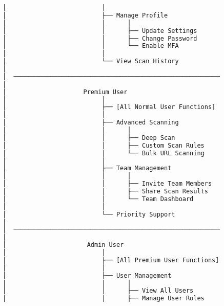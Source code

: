 \documentclass[main.tex]{subfiles}
\begin{document}
\begin{figure}[h]
\begin{lstlisting}[language=bash, caption=WebSecPen системийн Use Case диаграм]
│                          │                                      │
│                          ├── Manage Profile                    │
│                          │      │                              │
│                          │      ├── Update Settings            │
│                          │      ├── Change Password            │
│                          │      └── Enable MFA                 │
│                          │                                      │
│                          └── View Scan History                 │
│                                                                 │
│  ─────────────────────────────────────────────────────────────  │
│                                                                 │
│                     Premium User                                │
│                          │                                      │
│                          ├── [All Normal User Functions]       │
│                          │                                      │
│                          ├── Advanced Scanning                 │
│                          │      │                              │
│                          │      ├── Deep Scan                  │
│                          │      ├── Custom Scan Rules          │
│                          │      └── Bulk URL Scanning          │
│                          │                                      │
│                          ├── Team Management                   │
│                          │      │                              │
│                          │      ├── Invite Team Members        │
│                          │      ├── Share Scan Results         │
│                          │      └── Team Dashboard             │
│                          │                                      │
│                          └── Priority Support                  │
│                                                                 │
│  ─────────────────────────────────────────────────────────────  │
│                                                                 │
│                      Admin User                                 │
│                          │                                      │
│                          ├── [All Premium User Functions]      │
│                          │                                      │
│                          ├── User Management                   │
│                          │      │                              │
│                          │      ├── View All Users             │
│                          │      ├── Manage User Roles          │

\end{lstlisting}
\end{figure}
\end{document}
